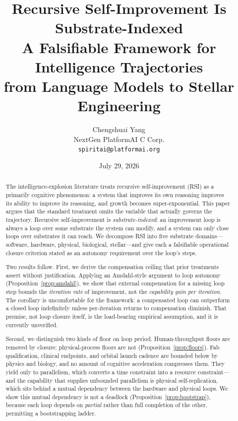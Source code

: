 \documentclass[11pt]{article}
\title{\LARGE Recursive Self-Improvement Is Substrate-Indexed\\[4pt]
\Large A Falsifiable Framework for Intelligence Trajectories\\
\Large from Language Models to Stellar Engineering}
\author{Chengshuai Yang\\
NextGen PlatformAI C Corp.\\
\texttt{spiritai@platformai.org}}
\date{July 29, 2026}
\begin{document}
\maketitle
\thispagestyle{empty}

\begin{abstract}
\noindent
The intelligence-explosion literature treats recursive self-improvement (RSI) as a primarily cognitive phenomenon: a system that improves its own reasoning improves its ability to improve its reasoning, and growth becomes super-exponential. This paper argues that the standard treatment omits the variable that actually governs the trajectory. Recursive self-improvement is \emph{substrate-indexed}: an improvement loop is always a loop over some substrate the system can modify, and a system can only close loops over substrates it can reach. We decompose RSI into five substrate domains---software, hardware, physical, biological, stellar---and give each a falsifiable operational closure criterion stated as an autonomy requirement over the loop's steps.

Two results follow. First, we derive the compensation ceiling that prior treatments assert without justification. Applying an Amdahl-style argument to loop autonomy (Proposition~\ref{prop:amdahl}), we show that external compensation for a missing loop step bounds the \emph{iteration rate} of improvement, not the \emph{capability gain per iteration}. The corollary is uncomfortable for the framework: a compensated loop can outperform a closed loop indefinitely unless per-iteration returns to compensation diminish. That premise, not loop closure itself, is the load-bearing empirical assumption, and it is currently unverified.

Second, we distinguish two kinds of floor on loop period. Human-throughput floors are removed by closure; physical-process floors are not (Proposition~\ref{prop:floors}). Fab qualification, clinical endpoints, and orbital launch cadence are bounded below by physics and biology, and no amount of cognitive acceleration compresses them. They yield only to parallelism, which converts a time constraint into a resource constraint---and the capability that supplies unbounded parallelism is physical self-replication, which sits behind a mutual dependency between the hardware and physical loops. We show this mutual dependency is not a deadlock (Proposition~\ref{prop:bootstrap}), because each loop depends on \emph{partial} rather than full completion of the other, permitting a bootstrapping ladder.


\end{abstract}
\end{document}
